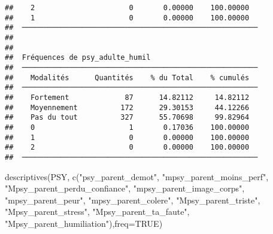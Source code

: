 \documentclass[
]{article}
\newenvironment{Shaded}{\begin{snugshade}}{\end{snugshade}}
\newcommand{\AttributeTok}[1]{\textcolor[rgb]{0.77,0.63,0.00}{#1}}
\newcommand{\ConstantTok}[1]{\textcolor[rgb]{0.00,0.00,0.00}{#1}}
\newcommand{\FunctionTok}[1]{\textcolor[rgb]{0.00,0.00,0.00}{#1}}
\newcommand{\NormalTok}[1]{#1}
\newcommand{\StringTok}[1]{\textcolor[rgb]{0.31,0.60,0.02}{#1}}
\begin{document}
\begin{verbatim}
##    2                      0       0.00000    100.00000   
##    1                      0       0.00000    100.00000   
##  ─────────────────────────────────────────────────────── 
## 
## 
##  Fréquences de psy_adulte_humil                          
##  ─────────────────────────────────────────────────────── 
##    Modalités      Quantités    % du Total    % cumulés   
##  ─────────────────────────────────────────────────────── 
##    Fortement             87      14.82112     14.82112   
##    Moyennement          172      29.30153     44.12266   
##    Pas du tout          327      55.70698     99.82964   
##    0                      1       0.17036    100.00000   
##    1                      0       0.00000    100.00000   
##    2                      0       0.00000    100.00000   
##  ───────────────────────────────────────────────────────
\end{verbatim}

\begin{Shaded}
\begin{Highlighting}[]
\FunctionTok{descriptives}\NormalTok{(PSY, }\FunctionTok{c}\NormalTok{(}\StringTok{"psy\_parent\_demot"}\NormalTok{,}
\StringTok{"mpsy\_parent\_moins\_perf"}\NormalTok{,}
\StringTok{"Mpsy\_parent\_perdu\_confiance"}\NormalTok{, }
\StringTok{"mpsy\_parent\_image\_corps"}\NormalTok{,}
\StringTok{"mpsy\_parent\_peur"}\NormalTok{, }
\StringTok{"mpsy\_parent\_colere"}\NormalTok{,}
\StringTok{"Mpsy\_parent\_triste"}\NormalTok{, }
\StringTok{"Mpsy\_parent\_stress"}\NormalTok{,}
\StringTok{"Mpsy\_parent\_ta\_faute"}\NormalTok{, }
\StringTok{"Mpsy\_parent\_humiliation"}\NormalTok{),}\AttributeTok{freq=}\ConstantTok{TRUE}\NormalTok{)}
\end{Highlighting}
\end{Shaded}
\end{document}
